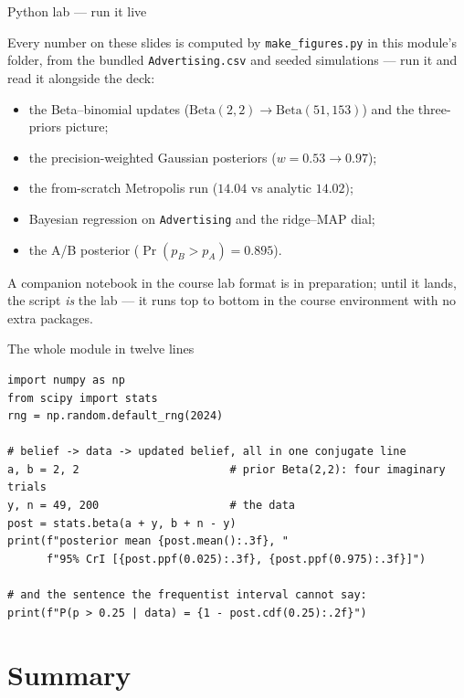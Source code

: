 \documentclass[aspectratio=169,11pt]{beamer}
\begin{document}
\begin{frame}{Python lab --- run it live}
  \begin{labnote}
    Every number on these slides is computed by \texttt{make\_figures.py} in this
    module's folder, from the bundled \texttt{Advertising.csv} and seeded
    simulations --- run it and read it alongside the deck:
    \begin{itemize}
      \item the Beta--binomial updates ($\text{Beta}(2,2) \to \text{Beta}(51,153)$)
            and the three-priors picture;
      \item the precision-weighted Gaussian posteriors ($w = 0.53 \to 0.97$);
      \item the from-scratch Metropolis run ($14.04$ vs analytic $14.02$);
      \item Bayesian regression on \texttt{Advertising} and the ridge--MAP dial;
      \item the A/B posterior ($\Pr(p_B > p_A) = 0.895$).
    \end{itemize}
    A companion notebook in the course lab format is in preparation; until it
    lands, the script \emph{is} the lab --- it runs top to bottom in the course
    environment with no extra packages.
  \end{labnote}
\end{frame}

\begin{frame}[fragile]{The whole module in twelve lines}
\begin{lstlisting}
import numpy as np
from scipy import stats
rng = np.random.default_rng(2024)

# belief -> data -> updated belief, all in one conjugate line
a, b = 2, 2                       # prior Beta(2,2): four imaginary trials
y, n = 49, 200                    # the data
post = stats.beta(a + y, b + n - y)
print(f"posterior mean {post.mean():.3f}, "
      f"95% CrI [{post.ppf(0.025):.3f}, {post.ppf(0.975):.3f}]")

# and the sentence the frequentist interval cannot say:
print(f"P(p > 0.25 | data) = {1 - post.cdf(0.25):.2f}")
\end{lstlisting}
\end{frame}

\section{Summary}
\end{document}
